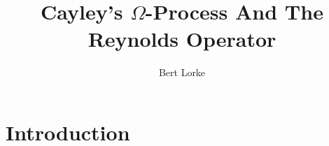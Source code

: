 \documentclass{article}
\title{Cayley's $\Omega$-Process And The Reynolds Operator}
\author{Bert Lorke}
\theoremstyle{prrt}
\begin{document}


\maketitle

\section{Introduction}





% 
\end{document}
